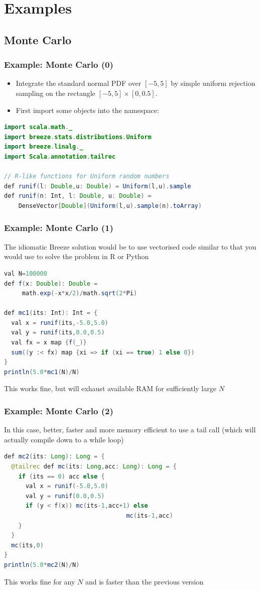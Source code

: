 \documentclass[mathserif,handout]{beamer}
\begin{document}
\section{Examples}

\subsection{Monte Carlo}

\begin{frame}[fragile]
\frametitle{Example: Monte Carlo (0)}
\begin{itemize}
\item Integrate the standard normal PDF over $[-5,5]$ by simple uniform rejection sampling on the rectangle $[-5,5]\times[0,0.5]$.
\item First import some objects into the namespace:
\end{itemize}
{\scriptsize
\begin{lstlisting}[language=java]
import scala.math._
import breeze.stats.distributions.Uniform
import breeze.linalg._
import Scala.annotation.tailrec

// R-like functions for Uniform random numbers
def runif(l: Double,u: Double) = Uniform(l,u).sample
def runif(n: Int, l: Double, u: Double) = 
    DenseVector[Double](Uniform(l,u).sample(n).toArray)
\end{lstlisting}} 
\end{frame}

\begin{frame}[fragile]
\frametitle{Example: Monte Carlo (1)}
The idiomatic Breeze solution would be to use vectorised code similar to that you would use to solve the problem in R or Python
{\small
\begin{lstlisting}[language=java]
val N=100000
def f(x: Double): Double = 
     math.exp(-x*x/2)/math.sqrt(2*Pi)

def mc1(its: Int): Int = {
  val x = runif(its,-5.0,5.0)
  val y = runif(its,0.0,0.5)
  val fx = x map {f(_)}
  sum((y :< fx) map {xi => if (xi == true) 1 else 0})
}
println(5.0*mc1(N)/N)
\end{lstlisting}}
This works fine, but will exhaust available RAM for sufficiently large $N$
\end{frame}

\begin{frame}[fragile]
\frametitle{Example: Monte Carlo (2)}
In this case, better, faster and more memory efficient to use a tail call (which will actually compile down to a while loop)
{\small
\begin{lstlisting}[language=java]
def mc2(its: Long): Long = {
  @tailrec def mc(its: Long,acc: Long): Long = {
    if (its == 0) acc else {
      val x = runif(-5.0,5.0)
      val y = runif(0.0,0.5)
      if (y < f(x)) mc(its-1,acc+1) else 
                                  mc(its-1,acc)
    }  
  }
  mc(its,0)
}
println(5.0*mc2(N)/N)
\end{lstlisting}}
This works fine for any $N$ and is faster than the previous version
\end{frame}
\end{document}
